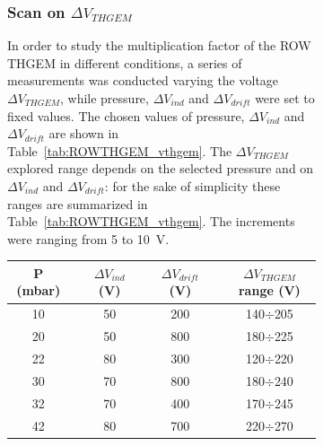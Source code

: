 \documentclass[a4paper, 11 pt]{article}
\newcommand{\Vind}{$\Delta V_{ind}$}
\newcommand{\Vthgem}{$\Delta V_{THGEM}$}
\newcommand{\Vdrift}{$ \Delta V_{drift}$}
\begin{document}
\begin{figure}[htbp]
\begin{figure}[htbp]


\clearpage

\subsubsection{Scan on \Vthgem}

In order to study the multiplication factor of the ROW THGEM in different conditions, a series of measurements was conducted varying the voltage \Vthgem, while pressure, \Vind{} and \Vdrift{} were set to fixed values.
The chosen values of pressure, \Vind{} and \Vdrift{} are shown in Table~\ref{tab:ROWTHGEM_vthgem}.
The \Vthgem{} explored range depends on the selected pressure and on \Vind{} and \Vdrift: for the sake of simplicity these ranges are summarized in Table~\ref{tab:ROWTHGEM_vthgem}.
The increments were ranging from 5 to 10~V.


\begin{table} [htbp]
	\begin{center}
		\renewcommand{\arraystretch}{1.2}
		\begin{tabular} {ccccccc}
			P (mbar) & & \Vind{} (V) & & \Vdrift{} (V) & & \Vthgem{} range (V)\\
			\toprule[0.1em]
			10	& & 50	& & 200	& & 140$\div$205 \\
			20	& &	50	& &	800 & & 180$\div$225 \\
			22	& & 80	& & 300	& & 120$\div$220 \\
			30	& &	70	& & 800 & & 180$\div$240 \\
			32	& & 70	& &	400	& & 170$\div$245 \\
			42	& & 80	& & 700 & & 220$\div$270 \\


\end{tabular}
\end{center}
\end{table}
\end{figure}
\end{figure}
\end{document}
